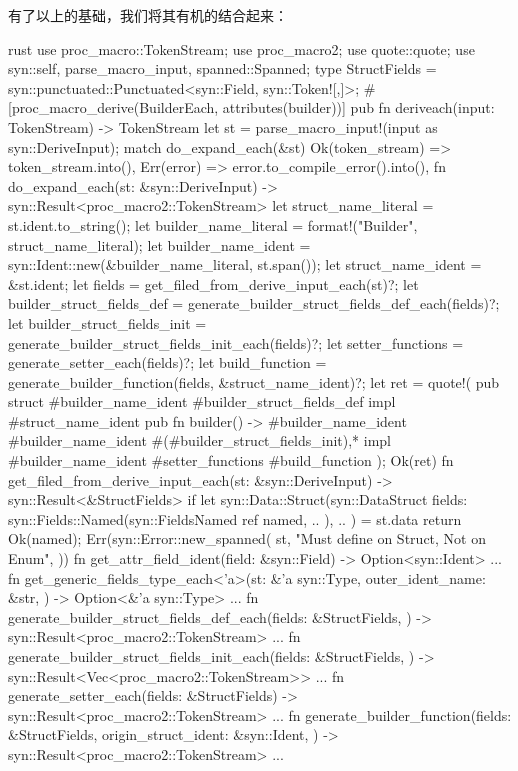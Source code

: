 有了以上的基础，我们将其有机的结合起来：
\begin{code-block}{rust}
use proc_macro::TokenStream;
use proc_macro2;
use quote::quote;
use syn::{self, parse_macro_input, spanned::Spanned};
type StructFields = syn::punctuated::Punctuated<syn::Field, syn::Token![,]>;
#[proc_macro_derive(BuilderEach, attributes(builder))]
pub fn deriveach(input: TokenStream) -> TokenStream {
    let st = parse_macro_input!(input as syn::DeriveInput);
    match do_expand_each(&st) {
        Ok(token_stream) => token_stream.into(),
        Err(error) => error.to_compile_error().into(),
    }
}
fn do_expand_each(st: &syn::DeriveInput) -> syn::Result<proc_macro2::TokenStream> {
    let struct_name_literal = st.ident.to_string();
    let builder_name_literal = format!("{}Builder", struct_name_literal);
    let builder_name_ident = syn::Ident::new(&builder_name_literal, st.span());
    let struct_name_ident = &st.ident;
    let fields = get_filed_from_derive_input_each(st)?;
    let builder_struct_fields_def = generate_builder_struct_fields_def_each(fields)?;
    let builder_struct_fields_init = generate_builder_struct_fields_init_each(fields)?;
    let setter_functions = generate_setter_each(fields)?;
    let build_function = generate_builder_function(fields, &struct_name_ident)?;
    let ret = quote!(
        pub struct #builder_name_ident {
            #builder_struct_fields_def
        }
        impl #struct_name_ident {
            pub fn builder() -> #builder_name_ident {
                #builder_name_ident {
                    #(#builder_struct_fields_init),*
                }
            }
        }
        impl #builder_name_ident {
            #setter_functions
            #build_function
        }
    );
    Ok(ret)
}
fn get_filed_from_derive_input_each(st: &syn::DeriveInput) -> syn::Result<&StructFields> {
    if let syn::Data::Struct(syn::DataStruct {
        fields: syn::Fields::Named(syn::FieldsNamed { ref named, .. }),
        ..
    }) = st.data
    {
        return Ok(named);
    }
    Err(syn::Error::new_spanned(
        st,
        "Must define on Struct, Not on Enum",
    ))
}
fn get_attr_field_ident(field: &syn::Field) -> Option<syn::Ident> {...}
fn get_generic_fields_type_each<'a>(st: &'a syn::Type, outer_ident_name: &str,
) -> Option<&'a syn::Type> {...}
fn generate_builder_struct_fields_def_each(fields: &StructFields,
) -> syn::Result<proc_macro2::TokenStream> {...}
fn generate_builder_struct_fields_init_each(fields: &StructFields,
) -> syn::Result<Vec<proc_macro2::TokenStream>> {...}
fn generate_setter_each(fields: &StructFields) -> syn::Result<proc_macro2::TokenStream> {...}
fn generate_builder_function(fields: &StructFields, origin_struct_ident: &syn::Ident,
) -> syn::Result<proc_macro2::TokenStream> {...}
\end{code-block}

